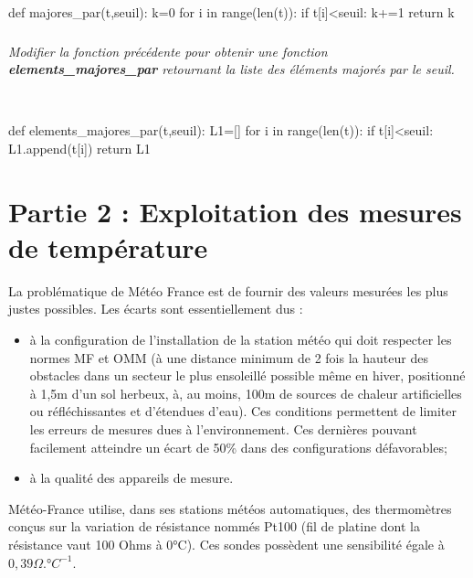 \documentclass[10pt,fleqn]{article} %
\begin{document}
\ifprof
\begin{corrige}~\
\begin{python}
def majores_par(t,seuil):
    k=0
    for i in range(len(t)):
        if t[i]<seuil:
            k+=1
    return k
\end{python}
\end{corrige}
\else
\fi

\subparagraph{}
\textit{Modifier la fonction précédente pour obtenir une fonction \textbf{elements\_majores\_par}
  retournant la liste des éléments majorés par le seuil.}
	
\ifprof
\begin{corrige}~\
\begin{python}
def elements_majores_par(t,seuil):
    L1=[]
    for i in range(len(t)):
        if t[i]<seuil:
            L1.append(t[i])
    return L1
\end{python}
\end{corrige}
\else
\fi



\section*{Partie 2 : Exploitation des mesures de température}
La problématique de Météo France est de fournir des valeurs mesurées les plus justes possibles. Les écarts sont essentiellement dus :
\begin{itemize}
	\item à la configuration de l'installation de la station météo qui doit respecter les normes MF et OMM (à une distance minimum de 2 fois la hauteur des obstacles dans un secteur le plus ensoleillé possible même en hiver, positionné à 1,5m d'un sol herbeux, à, au moins, 100m de sources de chaleur artificielles ou réfléchissantes et d'étendues d'eau). Ces conditions permettent de limiter les erreurs de mesures dues à l'environnement. Ces dernières pouvant facilement atteindre un écart de 50\% dans des configurations défavorables;
	\item à la qualité des appareils de mesure.
\end{itemize}

\vspace{0.5cm}
Météo-France utilise, dans ses stations météos automatiques, des thermomètres conçus sur la variation de résistance nommés Pt100 (fil de platine dont la résistance vaut 100 Ohms à 0°C). Ces sondes possèdent une sensibilité égale à $0,39 \Omega.°C^{-1}$.
\end{document}
